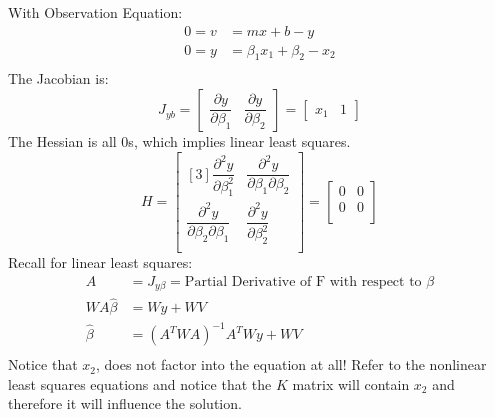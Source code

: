 \documentclass{article}
\begin{document}
	With Observation Equation:
	\begin{align*}
	0 = v &= mx + b - y \\
	0 = y &= \beta_1x_1 + \beta_2 - x_2 \\
	\end{align*}
	The Jacobian is:
	\[
	J_{yb} = 
	\begin{bmatrix}
	\dfrac{\partial y}{\partial \beta_1} & \dfrac{\partial y}{\partial \beta_2}
	\end{bmatrix}
	= 
	\begin{bmatrix}
	x_1 & 1
	\end{bmatrix}
	\]
	The Hessian is all 0s, which implies linear least squares.
	\[
	H = 
	\begin{bmatrix}[3]
	\dfrac{\partial^2 y}{\partial \beta_1^2} & \dfrac{\partial^2 y}{\partial \beta_1 \partial \beta_2} \\
	\dfrac{\partial^2 y}{\partial \beta_2 \partial \beta_1} & \dfrac{\partial^2 y}{\partial \beta_2^2} \\
	\end{bmatrix}
	= 
	\begin{bmatrix}
	0 & 0 \\
	0 & 0 \\
	\end{bmatrix}
	\]
	Recall for linear least squares:
	\begin{align*}
	A &= J_{y\beta} = \text{Partial Derivative of F with respect to }\beta \\
	WA\hat{\beta} &= Wy + WV\\
	\hat{\beta} &= (A^TWA)^{-1}A^TWy + WV\\
	\end{align*}
	Notice that $x_2$, does not factor into the equation at all! Refer to the nonlinear least squares equations and notice that the $K$ matrix will contain $x_2$ and therefore it will influence the solution.  
	
	
	
\end{document}
